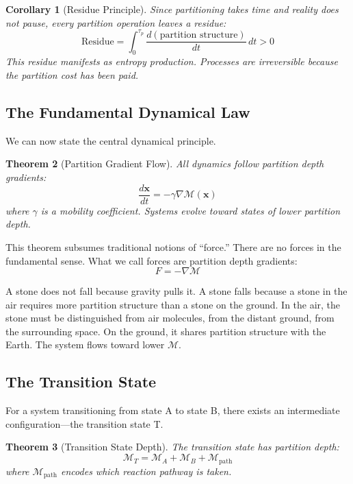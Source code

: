 \documentclass[twocolumn,10pt,a4paper]{article}
\newtheorem{theorem}{Theorem}[section]
\newtheorem{corollary}[theorem]{Corollary}
\theoremstyle{definition}
\theoremstyle{remark}
\newcommand{\Depth}{\mathcal{M}}
\begin{document}
\begin{corollary}[Residue Principle]
\label{cor:residue}
Since partitioning takes time and reality does not pause, every partition operation leaves a residue:
\begin{equation}
    \text{Residue} = \int_0^{\tau_p} \frac{d(\text{partition structure})}{dt} \, dt > 0
\end{equation}
This residue manifests as entropy production. Processes are irreversible because the partition cost has been paid.
\end{corollary}

\subsection{The Fundamental Dynamical Law}

We can now state the central dynamical principle.

\begin{theorem}[Partition Gradient Flow]
\label{thm:gradient}
All dynamics follow partition depth gradients:
\begin{equation}
    \frac{d\mathbf{x}}{dt} = -\gamma \nabla\Depth(\mathbf{x})
\end{equation}
where $\gamma$ is a mobility coefficient. Systems evolve toward states of lower partition depth.
\end{theorem}

This theorem subsumes traditional notions of ``force.'' There are no forces in the fundamental sense. What we call forces are partition depth gradients:
\begin{equation}
    F = -\nabla\Depth
\end{equation}

A stone does not fall because gravity pulls it. A stone falls because a stone in the air requires more partition structure than a stone on the ground. In the air, the stone must be distinguished from air molecules, from the distant ground, from the surrounding space. On the ground, it shares partition structure with the Earth. The system flows toward lower $\Depth$.

\subsection{The Transition State}

For a system transitioning from state A to state B, there exists an intermediate configuration---the transition state T.

\begin{theorem}[Transition State Depth]
\label{thm:transition}
The transition state has partition depth:
\begin{equation}
    \Depth_T = \Depth_A + \Depth_B + \Depth_{\mathrm{path}}
\end{equation}
where $\Depth_{\mathrm{path}}$ encodes which reaction pathway is taken.
\end{theorem}
\end{document}

